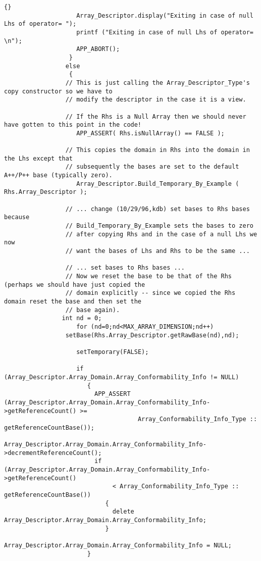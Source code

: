 \documentclass[10pt]{llncs}
\begin{document}
\begin{lstlisting}{}
                    Array_Descriptor.display("Exiting in case of null Lhs of operator= ");
                    printf ("Exiting in case of null Lhs of operator= \n");
                    APP_ABORT();
                  }
                 else
                  {
                 // This is just calling the Array_Descriptor_Type's copy constructor so we have to
                 // modify the descriptor in the case it is a view.

                 // If the Rhs is a Null Array then we should never have gotten to this point in the code!
                    APP_ASSERT( Rhs.isNullArray() == FALSE );

                 // This copies the domain in Rhs into the domain in the Lhs except that
                 // subsequently the bases are set to the default A++/P++ base (typically zero).
                    Array_Descriptor.Build_Temporary_By_Example ( Rhs.Array_Descriptor );

                 // ... change (10/29/96,kdb) set bases to Rhs bases because 
                 // Build_Temporary_By_Example sets the bases to zero 
                 // after copying Rhs and in the case of a null Lhs we now 
                 // want the bases of Lhs and Rhs to be the same ...

                 // ... set bases to Rhs bases ...
                 // Now we reset the base to be that of the Rhs (perhaps we should have just copied the
                 // domain explicitly -- since we copied the Rhs domain reset the base and then set the
                 // base again).
	            int nd = 0; 
                    for (nd=0;nd<MAX_ARRAY_DIMENSION;nd++)
		         setBase(Rhs.Array_Descriptor.getRawBase(nd),nd);

                    setTemporary(FALSE);

                    if (Array_Descriptor.Array_Domain.Array_Conformability_Info != NULL)
                       {
                         APP_ASSERT (Array_Descriptor.Array_Domain.Array_Conformability_Info->getReferenceCount() >= 
                                     Array_Conformability_Info_Type :: getReferenceCountBase());
                         Array_Descriptor.Array_Domain.Array_Conformability_Info->decrementReferenceCount();
                         if (Array_Descriptor.Array_Domain.Array_Conformability_Info->getReferenceCount()
                              < Array_Conformability_Info_Type :: getReferenceCountBase())
                            {
                              delete Array_Descriptor.Array_Domain.Array_Conformability_Info;
                            }
                         Array_Descriptor.Array_Domain.Array_Conformability_Info = NULL;
                       }


\end{lstlisting}
\end{document}
